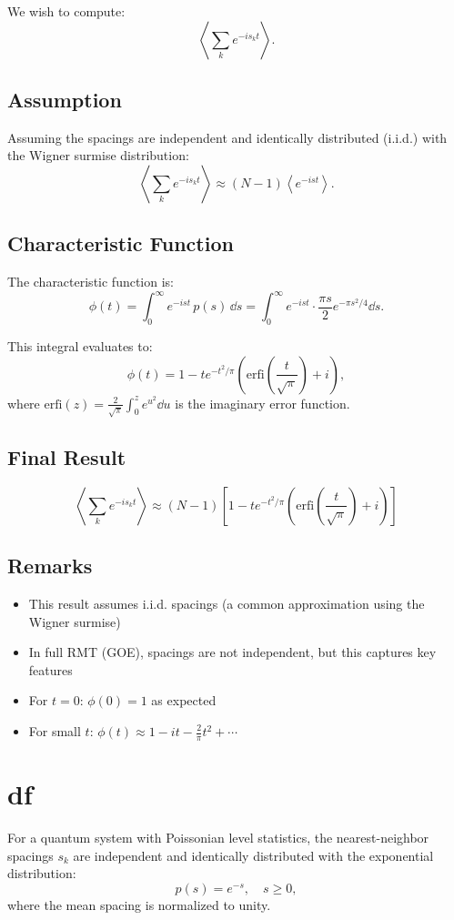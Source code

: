 \documentclass[10pt,a4paper]{article}
\begin{document}
We wish to compute:
\[
\left\langle \sum_k e^{-i s_k t} \right\rangle.
\]

\subsection*{Assumption}
Assuming the spacings are independent and identically distributed (i.i.d.) with the Wigner surmise distribution:
\[
\left\langle \sum_k e^{-i s_k t} \right\rangle \approx (N-1) \left\langle e^{-i s t} \right\rangle.
\]

\subsection*{Characteristic Function}
The characteristic function is:
\[
\phi(t) = \int_0^\infty e^{-i s t} \, p(s) \, \dd s = \int_0^\infty e^{-i s t} \cdot \frac{\pi s}{2} e^{-\pi s^2 / 4} \dd s.
\]

This integral evaluates to:
\[
\phi(t) = 1 - t e^{-t^2/\pi} \left( \mathrm{erfi}\left( \frac{t}{\sqrt{\pi}} \right) + i \right),
\]
where $\mathrm{erfi}(z) = \frac{2}{\sqrt{\pi}} \int_0^z e^{u^2} \dd u$ is the imaginary error function.

\subsection*{Final Result}
\[
\boxed{\left\langle \sum_k e^{-i s_k t} \right\rangle \approx (N-1)\left[1 - t e^{-t^{2}/\pi}\left(\mathrm{erfi}\left(\frac{t}{\sqrt{\pi}}\right) + i\right)\right]}
\]

\subsection*{Remarks}
\begin{itemize}
    \item This result assumes i.i.d. spacings (a common approximation using the Wigner surmise)
    \item In full RMT (GOE), spacings are not independent, but this captures key features
    \item For $t = 0$: $\phi(0) = 1$ as expected
    \item For small $t$: $\phi(t) \approx 1 - i t - \frac{2}{\pi} t^2 + \cdots$
\end{itemize}

\section{df}
For a quantum system with Poissonian level statistics, the nearest-neighbor spacings $s_k$ are independent and identically distributed with the exponential distribution:
\[
p(s) = e^{-s}, \quad s \geq 0,
\]
where the mean spacing is normalized to unity.
\end{document}
